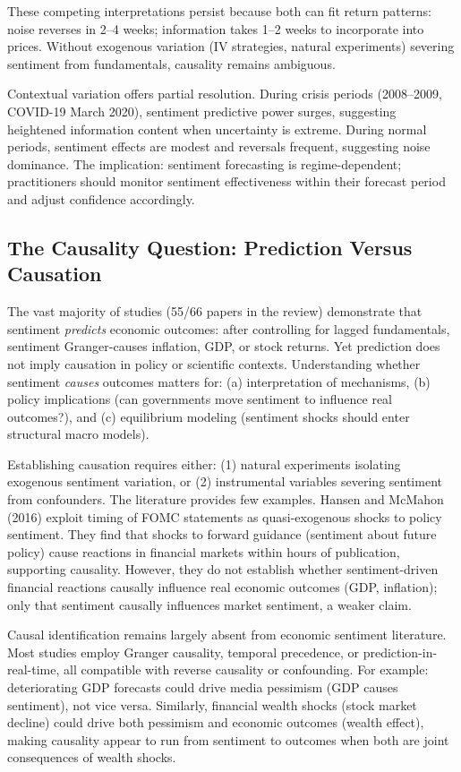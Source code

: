 \documentclass[11pt,twocolumn]{article}
\begin{document}
These competing interpretations persist because both can fit return patterns: noise reverses in 2--4 weeks; information takes 1--2 weeks to incorporate into prices. Without exogenous variation (IV strategies, natural experiments) severing sentiment from fundamentals, causality remains ambiguous.

Contextual variation offers partial resolution. During crisis periods (2008--2009, COVID-19 March 2020), sentiment predictive power surges, suggesting heightened information content when uncertainty is extreme. During normal periods, sentiment effects are modest and reversals frequent, suggesting noise dominance. The implication: sentiment forecasting is regime-dependent; practitioners should monitor sentiment effectiveness within their forecast period and adjust confidence accordingly.

\subsection{The Causality Question: Prediction Versus Causation}

The vast majority of studies (55/66 papers in the review) demonstrate that sentiment \emph{predicts} economic outcomes: after controlling for lagged fundamentals, sentiment Granger-causes inflation, GDP, or stock returns. Yet prediction does not imply causation in policy or scientific contexts. Understanding whether sentiment \emph{causes} outcomes matters for: (a) interpretation of mechanisms, (b) policy implications (can governments move sentiment to influence real outcomes?), and (c) equilibrium modeling (sentiment shocks should enter structural macro models).

Establishing causation requires either: (1) natural experiments isolating exogenous sentiment variation, or (2) instrumental variables severing sentiment from confounders. The literature provides few examples. Hansen and McMahon (2016) exploit timing of FOMC statements as quasi-exogenous shocks to policy sentiment. They find that shocks to forward guidance (sentiment about future policy) cause reactions in financial markets within hours of publication, supporting causality. However, they do not establish whether sentiment-driven financial reactions causally influence real economic outcomes (GDP, inflation); only that sentiment causally influences market sentiment, a weaker claim.

Causal identification remains largely absent from economic sentiment literature. Most studies employ Granger causality, temporal precedence, or prediction-in-real-time, all compatible with reverse causality or confounding. For example: deteriorating GDP forecasts could drive media pessimism (GDP causes sentiment), not vice versa. Similarly, financial wealth shocks (stock market decline) could drive both pessimism and economic outcomes (wealth effect), making causality appear to run from sentiment to outcomes when both are joint consequences of wealth shocks.
\end{document}
